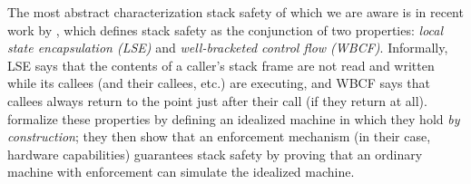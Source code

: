 \documentclass[acmsmall,review,anonymous]{acmart}\settopmatter{printfolios=true,printccs=false,printacmref=false}
\begin{document}
The most abstract characterization stack safety of which we are aware is in
recent work by \citet{Skorstengaard+19}, which defines stack safety as the conjunction of two
properties:
{\em local state encapsulation (LSE)} and {\em well-bracketed control flow (WBCF)}.
Informally, LSE says that the contents of
a caller's stack frame are not read and written while its callees (and their callees, etc.) are
executing, and WBCF says that callees always
return to the point just after their call (if they return at all).
\citet{Skorstengaard+19} formalize these properties by defining an idealized
machine in which they hold {\em by construction};
they then show that an enforcement
mechanism (in their case, hardware capabilities) guarantees stack safety by
proving that an ordinary machine with enforcement can simulate the idealized machine.
\end{document}
